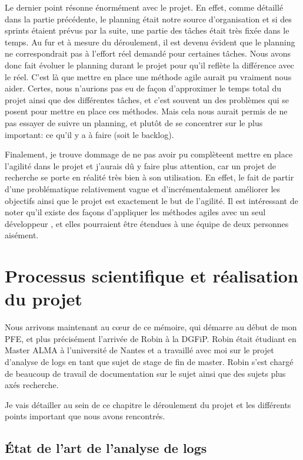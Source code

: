 \documentclass[openany, 11pt]{memoir}
\begin{document}
Le dernier point résonne énormément avec le projet. En effet, comme détaillé dans la partie précédente, le planning était notre source d'organisation et si des sprints étaient prévus par la suite, une partie des tâches était très fixée dans le temps. Au fur et à mesure du déroulement, il est devenu évident que le planning ne correspondrait pas à l'effort réel demandé pour certaines tâches. Nous avons donc fait évoluer le planning durant le projet pour qu'il reflète la différence avec le réel. C'est là que mettre en place une méthode agile aurait pu vraiment nous aider. Certes, nous n'aurions pas eu de façon d'approximer le temps total du projet ainsi que des différentes tâches, et c'est souvent un des problèmes qui se posent pour mettre en place ces méthodes. Mais cela nous aurait permis de ne pas essayer de suivre un planning, et plutôt de se concentrer sur le plus important: ce qu'il y a à faire (soit le backlog).

\bigskip
Finalement, je trouve dommage de ne pas avoir pu complèteent mettre en place l'agilité dans le projet et j'aurais dû y faire plus attention, car un projet de recherche se porte en réalité très bien à son utilisation. En effet, le fait de partir d'une problématique relativement vague et d'incrémentalement améliorer les objectifs ainsi que le projet est exactement le but de l'agilité. Il est intéressant de noter qu'il existe des façons d'appliquer les méthodes agiles avec un seul développeur \cite{agilesolo} \cite{ssdm}, et elles pourraient être étendues à une équipe de deux personnes aisément.
\newpage
\chapter{Processus scientifique et réalisation du projet}

Nous arrivons maintenant au cœur de ce mémoire, qui démarre au début de mon PFE, et plus précisément l'arrivée de Robin à la \gls{DGFiP}. Robin était étudiant en Master ALMA à l'université de Nantes et a travaillé avec moi sur le projet d'analyse de \glspl{log} en tant que sujet de stage de fin de master. Robin s'est chargé de beaucoup de travail de documentation sur le sujet ainsi que des sujets plus axés recherche.

Je vais détailler au sein de ce chapitre le déroulement du projet et les différents points important que nous avons rencontrés.

\section{État de l'art de l'analyse de logs}
\end{document}
